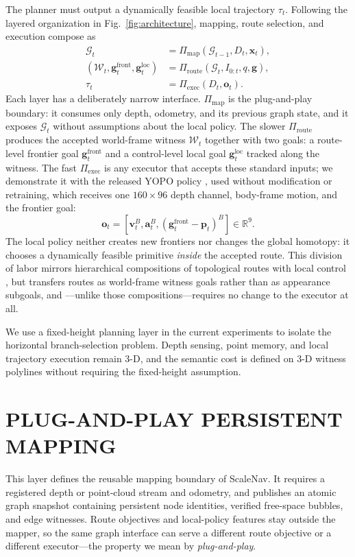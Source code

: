 \documentclass[letterpaper,10pt,conference]{ieeeconf}
\newcommand{\vect}[1]{\boldsymbol{#1}}
\newcommand{\R}{\mathbb{R}}
\begin{document}
The planner must output a dynamically feasible local trajectory $\tau_t$.
Following the layered organization in Fig.~\ref{fig:architecture}, mapping,
route selection, and execution compose as
\begin{align}
  \mathcal{G}_t
    &= \Pi_{\mathrm{map}}(\mathcal{G}_{t-1},D_t,\vect{x}_t), \\
  (\mathcal{W}_t,\vect{g}^{\mathrm{front}}_t,
   \vect{g}^{\mathrm{loc}}_t)
    &= \Pi_{\mathrm{route}}(\mathcal{G}_t,I_{0:t},q,\vect{g}), \\
  \tau_t
    &= \Pi_{\mathrm{exec}}(D_t,\vect{o}_t).
\end{align}
Each layer has a deliberately narrow interface.  $\Pi_{\mathrm{map}}$ is the
plug-and-play boundary: it consumes only depth, odometry, and its previous
graph state, and it exposes $\mathcal{G}_t$ without assumptions about the
local policy.  The slower $\Pi_{\mathrm{route}}$ produces the accepted
world-frame witness $\mathcal{W}_t$ together with two goals: a route-level
frontier goal $\vect{g}^{\mathrm{front}}_t$ and a control-level local goal
$\vect{g}^{\mathrm{loc}}_t$ tracked along the witness.  The fast
$\Pi_{\mathrm{exec}}$ is any executor that accepts these standard inputs; we
demonstrate it with the released YOPO policy \cite{yopo}, used without
modification or retraining, which receives one $160\times96$ depth channel,
body-frame motion, and the frontier goal:
\begin{equation}
 \vect{o}_t = [\vect{v}^{B}_t,\vect{a}^{B}_t,
                (\vect{g}^{\mathrm{front}}_t-\vect{p}_t)^{B}] \in \R^9.
\end{equation}
The local policy neither creates new frontiers nor changes the global
homotopy: it chooses a dynamically feasible primitive \emph{inside} the
accepted route.  This division of labor mirrors hierarchical compositions of
topological routes with local control \cite{meng2020,ving}, but transfers
routes as world-frame witness goals rather than as appearance subgoals, and
---unlike those compositions---requires no change to the executor at all.

We use a fixed-height planning layer in the current experiments to isolate
the horizontal branch-selection problem.  Depth sensing, point memory, and
local trajectory execution remain 3-D, and the semantic cost is defined on
3-D witness polylines without requiring the fixed-height assumption.

\section{PLUG-AND-PLAY PERSISTENT MAPPING}
\label{sec:topology}
This layer defines the reusable mapping boundary of ScaleNav.  It requires a
registered depth or point-cloud stream and odometry, and publishes an atomic
graph snapshot containing persistent node identities, verified free-space
bubbles, and edge witnesses.  Route objectives and local-policy features stay
outside the mapper, so the same graph interface can serve a different route
objective or a different executor---the property we mean by
\emph{plug-and-play}.
\end{document}
